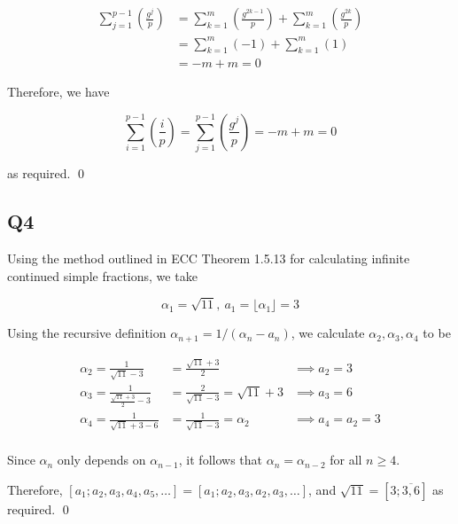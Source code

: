 \documentclass{amsart}
\begin{document}
    \begin{align*}
        \sum_{j=1}^{p-1} \left(\frac{g^j}{p}\right) &= \sum_{k=1}^{m} \left(\frac{g^{2k-1}}{p}\right) + \sum_{k=1}^{m} \left(\frac{g^{2k}}{p}\right) \\
        &= \sum_{k=1}^{m} (-1) + \sum_{k=1}^{m} (1) \\
        &= -m + m = 0
    \end{align*}

    Therefore, we have 

    \[\sum_{i=1}^{p-1} \left(\frac{i}{p}\right) = \sum_{j=1}^{p-1} \left(\frac{g^j}{p} \right) = -m + m = 0\]

    as required. \qed

    \hrulefill

    \subsection*{Q4} Using the method outlined in ECC Theorem 1.5.13 for calculating infinite continued simple fractions, we take

    \[\alpha_1 = \sqrt{11}, \ a_1 = \lfloor \alpha_1 \rfloor = 3\]

    \newpage
    Using the recursive definition $\alpha_{n+1} = 1/(\alpha_n - a_n)$, we calculate $\alpha_2, \alpha_3, \alpha_4$ to be
    
    \begin{align*}
        \alpha_2 = \frac{1}{\sqrt{11} - 3} &= \frac{\sqrt{11} + 3}{2} & \implies a_2 = 3 \\
        \alpha_3 = \frac{1}{\frac{\sqrt{11} + 3}{2} - 3} &= \frac{2}{\sqrt{11} - 3} = \sqrt{11} + 3 & \implies a_3 = 6 \\
        \alpha_4 = \frac{1}{\sqrt{11} + 3 - 6} &= \frac{1}{\sqrt{11} - 3} = \alpha_2 & \implies a_4 = a_2 = 3\\
    \end{align*}

    Since $\alpha_n$ only depends on $\alpha_{n - 1}$, it follows that $\alpha_n = \alpha_{n-2}$ for all $n \geq 4$.

    Therefore, $[a_1 ; a_2, a_3, a_4, a_5, \dots]= [a_1 ; a_2, a_3, a_2, a_3, \dots]$, and $\sqrt{11} = [3; \overline{3, 6}]$ as required. \qed
\end{document}
